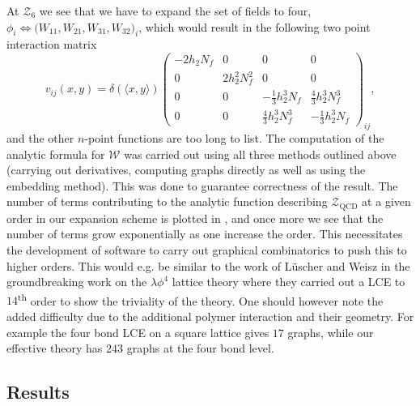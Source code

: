 %
At $\mathcal{Z}_6$ we see that we have to expand the set of fields to four,
$\phi_i \Leftrightarrow \big(W_{11}, W_{21}, W_{31}, W_{32}\big)_i$,
which would result in the following two point interaction matrix
%
\begin{equation}
  v_{ij}(x,y) = \delta(\langle x,y \rangle)
    \begin{pmatrix}
      -2 h_2 N_f & 0 & 0 & 0\\
      0 & 2 h_2^2 N_f^2 & 0 & 0\\
      0 & 0 & -\textstyle\frac{1}{3} h_2^3 N_f & \textstyle\frac{4}{3} h_2^3 N_f^3\\
      0 & 0 & \textstyle\frac{4}{3} h_2^3 N_f^3 & -\textstyle\frac{1}{3} h_2^3 N_f
    \end{pmatrix}_{ij},
\end{equation}
%
and the other $n$-point functions are too long to list. The computation of the
analytic formula for $\mathcal{W}$ was carried out using all three methods
outlined above (carrying out derivatives, computing graphs directly as well as
using the embedding method). This was done to guarantee correctness of the
result. The number of terms contributing to the analytic function describing
$\mathcal{Z}_{\mathrm{QCD}}$ at a given order in our expansion scheme is plotted
in , and once more we see that the number of terms
grow exponentially as one increase the order. This necessitates the development
of software to carry out graphical combinatorics to push this to higher orders.
This would e.g. be similar to the work of L\"{u}scher and Weisz in the
groundbreaking work on the $\lambda \phi^4$ lattice theory \citep{Luscher:1988gk,Luscher:1988uq}
where they carried out a LCE to $14$\textsuperscript{th} order to show the
triviality of the theory. One should however note the added difficulty due to
the additional polymer interaction and their geometry. For example the four bond
LCE on a square lattice gives $17$ graphs, while our effective theory has $243$
graphs at the four bond level.

\subsection{Results}

